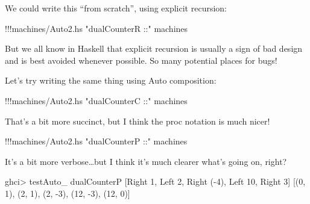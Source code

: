 \documentclass[]{article}
\newenvironment{Shaded}{}{}
\newcommand{\DataTypeTok}[1]{\textcolor[rgb]{0.56,0.13,0.00}{{#1}}}
\newcommand{\DecValTok}[1]{\textcolor[rgb]{0.25,0.63,0.44}{{#1}}}
\newcommand{\StringTok}[1]{\textcolor[rgb]{0.25,0.44,0.63}{{#1}}}
\newcommand{\FunctionTok}[1]{\textcolor[rgb]{0.02,0.16,0.49}{{#1}}}
\newcommand{\NormalTok}[1]{{#1}}
\begin{document}
We could write this ``from scratch'', using explicit recursion:

\begin{Shaded}
\begin{Highlighting}[]
\FunctionTok{!!!}\NormalTok{machines}\FunctionTok{/}\NormalTok{Auto2.hs }\StringTok{"dualCounterR ::"} \NormalTok{machines}
\end{Highlighting}
\end{Shaded}

But we all know in Haskell that explicit recursion is usually a sign of
bad design and is best avoided whenever possible. So many potential
places for bugs!

Let's try writing the same thing using Auto composition:

\begin{Shaded}
\begin{Highlighting}[]
\FunctionTok{!!!}\NormalTok{machines}\FunctionTok{/}\NormalTok{Auto2.hs }\StringTok{"dualCounterC ::"} \NormalTok{machines}
\end{Highlighting}
\end{Shaded}

That's a bit more succinct, but I think the proc notation is much nicer!

\begin{Shaded}
\begin{Highlighting}[]
\FunctionTok{!!!}\NormalTok{machines}\FunctionTok{/}\NormalTok{Auto2.hs }\StringTok{"dualCounterP ::"} \NormalTok{machines}
\end{Highlighting}
\end{Shaded}

It's a bit more verbose\ldots{}but I think it's much clearer what's
going on, right?

\begin{Shaded}
\begin{Highlighting}[]
\NormalTok{ghci}\FunctionTok{>} \NormalTok{testAuto_ dualCounterP [}\DataTypeTok{Right} \DecValTok{1}\NormalTok{, }\DataTypeTok{Left} \DecValTok{2}\NormalTok{, }\DataTypeTok{Right} \NormalTok{(}\FunctionTok{-}\DecValTok{4}\NormalTok{), }\DataTypeTok{Left} \DecValTok{10}\NormalTok{, }\DataTypeTok{Right} \DecValTok{3}\NormalTok{]}
\NormalTok{[(}\DecValTok{0}\NormalTok{, }\DecValTok{1}\NormalTok{), (}\DecValTok{2}\NormalTok{, }\DecValTok{1}\NormalTok{), (}\DecValTok{2}\NormalTok{, }\FunctionTok{-}\DecValTok{3}\NormalTok{), (}\DecValTok{12}\NormalTok{, }\FunctionTok{-}\DecValTok{3}\NormalTok{), (}\DecValTok{12}\NormalTok{, }\DecValTok{0}\NormalTok{)]}
\end{Highlighting}
\end{Shaded}
\end{document}
